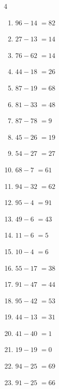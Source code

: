 \begin{multicols}{4}
\begin{enumerate}
  \item $96-14$
        $=82$

  \item $27-13$
        $=14$

  \item $76-62$
        $=14$

  \item $44-18$
        $=26$

  \item $87-19$
        $=68$

\columnbreak %

  \item $81-33$
        $=48$

  \item $87-78$
        $=9$

  \item $45-26$
        $=19$

  \item $54-27$
        $=27$

  \item $68-7$
        $=61$

  \item $94-32$
        $=62$

  \item $95-4$
        $=91$

  \item $49-6$
        $=43$

  \item $11-6$
        $=5$

  \item $10-4$
        $=6$

  \item $55-17$
        $=38$

  \item $91-47$
        $=44$

  \item $95-42$
        $=53$

  \item $44-13$
        $=31$

  \item $41-40$
        $=1$

  \item $19-19$
        $=0$

  \item $94-25$
        $=69$

  \item $91-25$
        $=66$


\end{enumerate}
\end{multicols}
